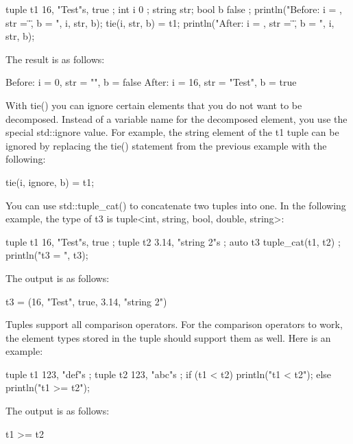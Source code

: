 \begin{cpp}
tuple t1 { 16, "Test"s, true };
int i { 0 };
string str;
bool b { false };
println("Before: i = {}, str = \"{}\", b = {}", i, str, b);
tie(i, str, b) = t1;
println("After: i = {}, str = \"{}\", b = {}", i, str, b);
\end{cpp}

The result is as follows:

\begin{shell}
Before: i = 0, str = "", b = false
After: i = 16, str = "Test", b = true
\end{shell}

With tie() you can ignore certain elements that you do not want to be decomposed. Instead of a variable name for the decomposed element, you use the special std::ignore value. For example, the string element of the t1 tuple can be ignored by replacing the tie() statement from the previous example with the following:

\begin{cpp}
tie(i, ignore, b) = t1;
\end{cpp}


You can use std::tuple\_cat() to concatenate two tuples into one. In the following example, the type of t3 is tuple<int, string, bool, double, string>:

\begin{cpp}
tuple t1 { 16, "Test"s, true };
tuple t2 { 3.14, "string 2"s };
auto t3 { tuple_cat(t1, t2) };
println("t3 = {}", t3);
\end{cpp}

The output is as follows:

\begin{shell}
t3 = (16, "Test", true, 3.14, "string 2")
\end{shell}


Tuples support all comparison operators. For the comparison operators to work, the element types stored in the tuple should support them as well. Here is an example:

\begin{cpp}
tuple t1 { 123, "def"s };
tuple t2 { 123, "abc"s };
if (t1 < t2) { println("t1 < t2"); }
else { println("t1 >= t2"); }
\end{cpp}

The output is as follows:

\begin{shell}
t1 >= t2
\end{shell}

